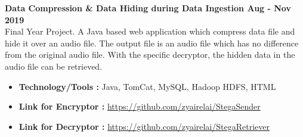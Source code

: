 \textbf{Data Compression \& Data Hiding during Data Ingestion \hfill Aug - Nov 2019} \vspace{0.1cm} \\
    Final Year Project. A Java based web application which compress data file and hide it over an audio file. The output file is an audio file which has no difference from the original audio file. With the specific decryptor, the hidden data in the audio file can be retrieved. \vspace{0.3cm}
    \begin{itemize}
        \item \textbf{Technology/Tools :} Java, TomCat, MySQL, Hadoop HDFS, HTML
        \item \textbf{Link for Encryptor :} \url{https://github.com/zyairelai/StegaSender}
        \item \textbf{Link for Decryptor :} \url{https://github.com/zyairelai/StegaRetriever}
    \end{itemize}
